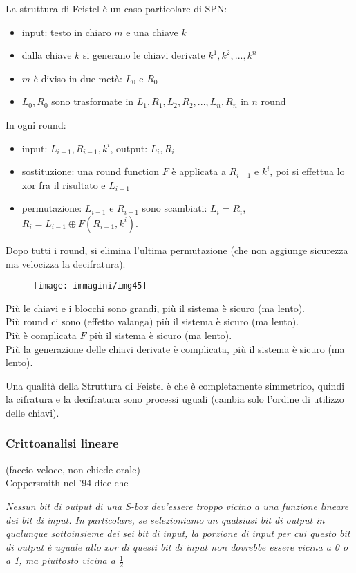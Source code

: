 La struttura di Feistel è un caso particolare di SPN:
\begin{itemize}
	\item input: testo in chiaro $m$ e una chiave $k$
	\item dalla chiave $k$ si generano le chiavi derivate $k^1, k^2, ..., k^n$
	\item $m$ è diviso in due metà: $L_0$ e $R_0$
	\item $L_0,R_0$ sono trasformate in $L_1,R_1, L_2,R_2, ..., L_n,R_n$ in $n$ round
\end{itemize}
In ogni round:
\begin{itemize}
	\item input: $L_{i-1}, R_{i-1}, k^i$, output: $L_i,R_i$
	\item sostituzione: una round function $F$ è applicata a $R_{i-1}$ e $k^i$, poi si effettua lo xor fra il risultato e $L_{i-1}$
	\item permutazione: $L_{i-1}$ e $R_{i-1}$ sono scambiati: $L_i=R_i$, $R_i=L_{i-1} \oplus F(R_{i-1}, k^i)$.
\end{itemize}
Dopo tutti i round, si elimina l'ultima permutazione (che non aggiunge sicurezza ma velocizza la decifratura).

\begin{figure}[h]
	\centering
	\texttt{[image: immagini/img45]}
\end{figure}

Più le chiavi e i blocchi sono grandi, più il sistema è sicuro (ma lento).\\
Più round ci sono (effetto valanga) più il sistema è sicuro (ma lento).\\
Più è complicata $F$ più il sistema è sicuro (ma lento).\\
Più la generazione delle chiavi derivate è complicata, più il sistema è sicuro (ma lento).

Una qualità della Struttura di Feistel è che è completamente simmetrico, quindi la cifratura e la decifratura sono processi uguali (cambia solo l'ordine di utilizzo delle chiavi).


\subsubsection*{Crittoanalisi lineare} 
(faccio veloce, non chiede orale)\\
Coppersmith nel '94 dice che 
\begin{center}
	\textit{Nessun bit di output di una S-box dev'essere troppo vicino a una funzione lineare dei bit di input. In particolare, se selezioniamo un qualsiasi bit di output in qualunque sottoinsieme dei sei bit di input, la porzione di input per cui questo bit di output è uguale allo xor di questi bit di input non dovrebbe essere vicina a 0 o a 1, ma piuttosto vicina a $\frac12$}
\end{center}

